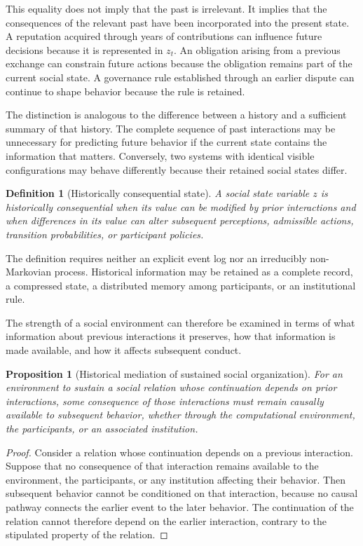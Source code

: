 \documentclass[11pt]{article}
\newtheorem{definition}{Definition}
\newtheorem{proposition}{Proposition}
\theoremstyle{remark}
\begin{document}
This equality does not imply that the past is irrelevant.
It implies that the consequences of the relevant past have
been incorporated into the present state. A reputation
acquired through years of contributions can influence
future decisions because it is represented in $z_t$.
An obligation arising from a previous exchange can
constrain future actions because the obligation remains
part of the current social state. A governance rule
established through an earlier dispute can continue to
shape behavior because the rule is retained.

The distinction is analogous to the difference between
a history and a sufficient summary of that history.
The complete sequence of past interactions may be
unnecessary for predicting future behavior if the
current state contains the information that matters.
Conversely, two systems with identical visible
configurations may behave differently because their
retained social states differ.

\begin{definition}[Historically consequential state]
A social state variable $z$ is \emph{historically
consequential} when its value can be modified by prior
interactions and when differences in its value can alter
subsequent perceptions, admissible actions, transition
probabilities, or participant policies.
\end{definition}

The definition requires neither an explicit event log nor
an irreducibly non-Markovian process. Historical information
may be retained as a complete record, a compressed state,
a distributed memory among participants, or an institutional
rule.

The strength of a social environment can therefore be
examined in terms of what information about previous
interactions it preserves, how that information is made
available, and how it affects subsequent conduct.

\begin{proposition}[Historical mediation of sustained social organization]
For an environment to sustain a social relation whose
continuation depends on prior interactions, some
consequence of those interactions must remain causally
available to subsequent behavior, whether through the
computational environment, the participants, or an
associated institution.
\end{proposition}

\begin{proof}
Consider a relation whose continuation depends on a
previous interaction. Suppose that no consequence of
that interaction remains available to the environment,
the participants, or any institution affecting their
behavior. Then subsequent behavior cannot be conditioned
on that interaction, because no causal pathway connects
the earlier event to the later behavior. The continuation
of the relation cannot therefore depend on the earlier
interaction, contrary to the stipulated property of
the relation.
\end{proof}
\end{document}
